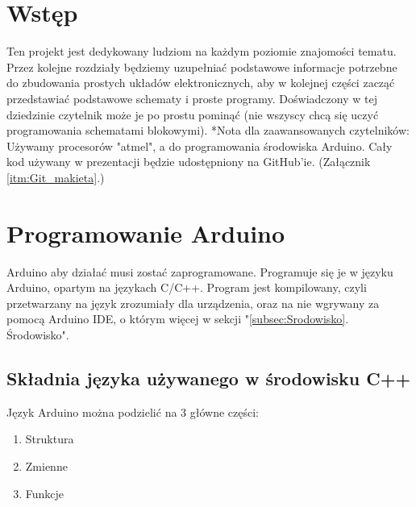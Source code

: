 \documentclass[a4paper,12pt, twoside]{article}
\let\oldsection\section		%
\renewcommand\section{\clearpage\oldsection}%
\begin{document}
\newpage\null\thispagestyle{empty}\newpage



\tableofcontents 


\thispagestyle {empty}

\section*{Wstęp}
Ten projekt jest dedykowany ludziom na każdym poziomie znajomości tematu. Przez kolejne rozdziały będziemy uzupełniać podstawowe informacje potrzebne do zbudowania prostych układów elektronicznych, aby w kolejnej części zacząć przedstawiać podstawowe schematy i proste programy. Doświadczony w tej dziedzinie czytelnik może je po prostu pominąć (nie wszyscy chcą się uczyć programowania schematami blokowymi). 
*Nota dla zaawansowanych czytelników:
Używamy procesorów "atmel", a do programowania środowiska Arduino. Cały kod używany w prezentacji będzie udostępniony na GitHub'ie. (Załącznik \ref{itm:Git_makieta}.)

\section{Programowanie Arduino}

Arduino aby działać musi zostać zaprogramowane. Programuje się je w języku Arduino, opartym na językach C/C++.
Program jest kompilowany, czyli przetwarzany na język zrozumiały dla urządzenia, oraz na nie wgrywany za pomocą
Arduino IDE, o którym więcej w sekcji "\ref{subsec:Srodowisko}. Środowisko". 


\subsection {Składnia języka używanego w środowisku C++}
  Język Arduino można podzielić na 3 główne części:
  \begin{enumerate}
	\item Struktura
	\item Zmienne
	\item Funkcje
\end{enumerate}
\end{document}
